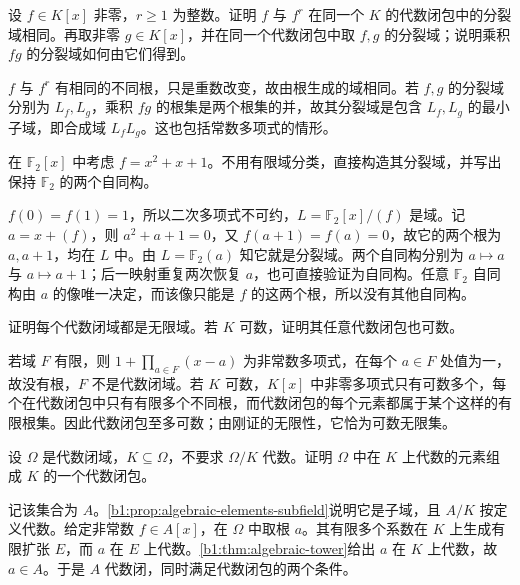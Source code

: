 \begin{exercise}\label{b1:ex:15-3}
	设 \(f\in K[x]\) 非零，\(r\geq1\) 为整数。证明 \(f\) 与 \(f^r\) 在同一个 \(K\) 的代数闭包中的分裂域相同。再取非零 \(g\in K[x]\)，并在同一个代数闭包中取 \(f,g\) 的分裂域；说明乘积 \(fg\) 的分裂域如何由它们得到。
\end{exercise}
\begin{solution}
	\(f\) 与 \(f^r\) 有相同的不同根，只是重数改变，故由根生成的域相同。若 \(f,g\) 的分裂域分别为 \(L_f,L_g\)，乘积 \(fg\) 的根集是两个根集的并，故其分裂域是包含 \(L_f,L_g\) 的最小子域，即合成域 \(L_fL_g\)。这也包括常数多项式的情形。
\end{solution}

\begin{exercise}\label{b1:ex:15-4}
	在 \(\mathbb F_2[x]\) 中考虑 \(f=x^2+x+1\)。不用有限域分类，直接构造其分裂域，并写出保持 \(\mathbb F_2\) 的两个自同构。
\end{exercise}
\begin{solution}
	\(f(0)=f(1)=1\)，所以二次多项式不可约，\(L=\mathbb F_2[x]/(f)\) 是域。记 \(a=x+(f)\)，则 \(a^2+a+1=0\)，又 \(f(a+1)=f(a)=0\)，故它的两个根为 \(a,a+1\)，均在 \(L\) 中。由 \(L=\mathbb F_2(a)\) 知它就是分裂域。两个自同构分别为 \(a\mapsto a\) 与 \(a\mapsto a+1\)；后一映射重复两次恢复 \(a\)，也可直接验证为自同构。任意 \(\mathbb F_2\) 自同构由 \(a\) 的像唯一决定，而该像只能是 \(f\) 的这两个根，所以没有其他自同构。
\end{solution}

\begin{exercise}\label{b1:ex:15-5}
	证明每个代数闭域都是无限域。若 \(K\) 可数，证明其任意代数闭包也可数。
\end{exercise}
\begin{solution}
	若域 \(F\) 有限，则 \(1+\prod_{a\in F}(x-a)\) 为非常数多项式，在每个 \(a\in F\) 处值为一，故没有根，\(F\) 不是代数闭域。若 \(K\) 可数，\(K[x]\) 中非零多项式只有可数多个，每个在代数闭包中只有有限多个不同根，而代数闭包的每个元素都属于某个这样的有限根集。因此代数闭包至多可数；由刚证的无限性，它恰为可数无限集。
\end{solution}

\begin{exercise}\label{b1:ex:15-6}
	设 \(\Omega\) 是代数闭域，\(K\subseteq\Omega\)，不要求 \(\Omega/K\) 代数。证明 \(\Omega\) 中在 \(K\) 上代数的元素组成 \(K\) 的一个代数闭包。
\end{exercise}
\begin{solution}
	记该集合为 \(A\)。\cref{b1:prop:algebraic-elements-subfield}说明它是子域，且 \(A/K\) 按定义代数。给定非常数 \(f\in A[x]\)，在 \(\Omega\) 中取根 \(a\)。其有限多个系数在 \(K\) 上生成有限扩张 \(E\)，而 \(a\) 在 \(E\) 上代数。\cref{b1:thm:algebraic-tower}给出 \(a\) 在 \(K\) 上代数，故 \(a\in A\)。于是 \(A\) 代数闭，同时满足代数闭包的两个条件。
\end{solution}

